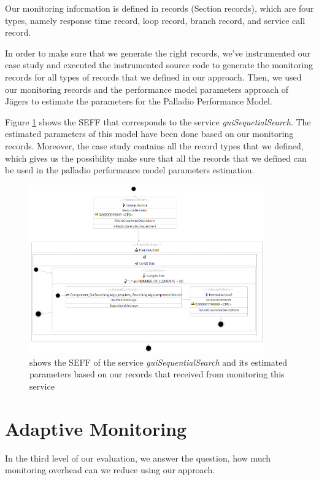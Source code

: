 Our monitoring information is defined in records (Section records), which are four types, namely response time record, loop record, branch record, and service call record. 

In order to make sure that we generate the right records, we've instrumented our case study and executed the instrumented source code to generate the monitoring records for all types of records that we defined in our approach. Then, we used our monitoring records and the performance model parameters approach of Jägers \cite{jagers2018Iterative} to estimate the parameters for the Palladio Performance Model.

Figure \ref{fig:guiSequentialSearch_seff} shows the SEFF that corresponds to the service \textit{guiSequetialSearch}. The estimated parameters of this model have been done based on our monitoring records. Moreover, the case study contains all the record types that we defined, which gives us the possibility make sure that all the records that we defined can be used in the palladio performance model parameters estimation.


\begin{figure}[h]
\centering
\includegraphics[width=0.9\textwidth]{figures/records_evaluation}
\caption{shows the SEFF of the service \textit{guiSequentialSearch} and its estimated parameters based on our records that received from monitoring this service}
\label{fig:guiSequentialSearch_seff}
\end{figure}


\section{Adaptive Monitoring}
\label{sec:Adaptive Monitoring}
In the third level of our evaluation, we answer the question, how much monitoring overhead can we reduce using our approach. 

